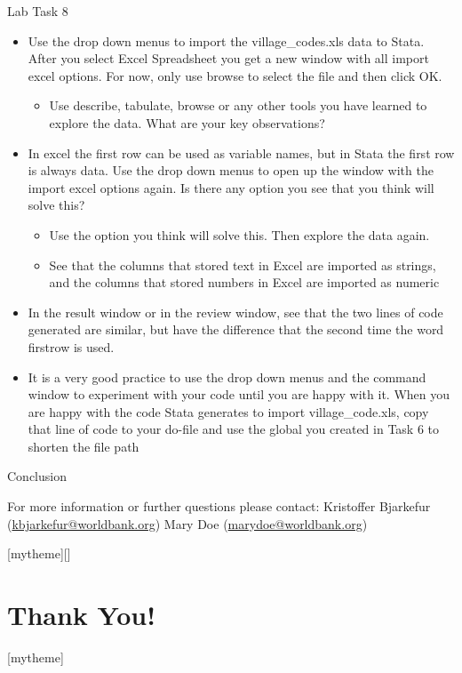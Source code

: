 \documentclass[aspectratio=169]{beamer}
\newcommand{\sectionpic}[2]{
	\setbeamertemplate{section page}[mytheme][#2]
	\section{#1}
	\setbeamertemplate{section page}[mytheme]
}
\begin{document}
\begin{frame}{Lab Task 8}
\begin{itemize}
	\item Use the drop down menus to import the village\_codes.xls data to Stata. After you select Excel Spreadsheet you get a new window with all import excel options. For now, only use browse to select the file and then click OK.
		\begin{itemize}
			\item Use describe, tabulate, browse or any other tools you have learned to explore the data. What are your key observations?
		\end{itemize}
	\item In excel the first row can be used as variable names, but in Stata the first row is always data. Use the drop down menus to open up the window with the import excel options again. Is there any option you see that you think will solve this?
		\begin{itemize}
			\item Use the option you think will solve this. Then explore the data again.
			\item See that the columns that stored text in Excel are imported as strings, and the columns that stored numbers in Excel are imported as numeric
		\end{itemize}	 
	\item In the result window or in the review window, see that the two lines of code generated are similar, but have the difference that the second time the word firstrow is used. 
	\item It is a very good practice to use the drop down menus and the command window to experiment with your code until you are happy with it. When you are happy with the code Stata generates to import village\_code.xls, copy that line of code to your do-file and use the global you created in Task 6 to shorten the file path
\end{itemize}
\end{frame}

\begin{frame}{Conclusion}


\vspace{20mm}
For more information or further questions please contact:
\newline Kristoffer Bjarkefur (\url{kbjarkefur@worldbank.org}) \newline Mary Doe (\url{marydoe@worldbank.org})

\end{frame}

\sectionpic{Thank You!}{}
\end{document}
